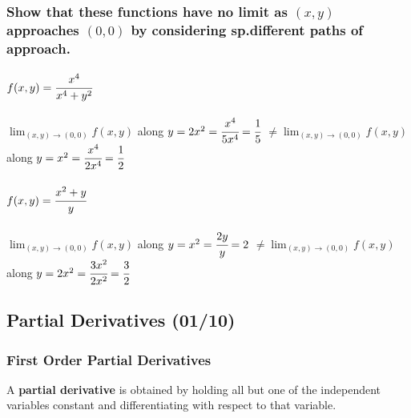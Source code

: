 \documentclass[
  letterpaper,
  DIV=11,
  numbers=noendperiod]{scrartcl}
\let\oldparagraph\paragraph
\renewcommand{\paragraph}[1]{\oldparagraph{#1}\mbox{}}
\begin{document}
\hypertarget{show-that-these-functions-have-no-limit-as-x-y-approaches-0-0-by-considering-sp.different-paths-of-approach.}{%
\subsubsection{\texorpdfstring{Show that these functions have no limit
as \((x, y)\) approaches \((0, 0)\) by considering sp.different paths of
approach.}{Show that these functions have no limit as (x, y) approaches (0, 0) by considering sp.different paths of approach.}}\label{show-that-these-functions-have-no-limit-as-x-y-approaches-0-0-by-considering-sp.different-paths-of-approach.}}

\hypertarget{fxy-cfracx4x4y2}{%
\paragraph{\texorpdfstring{\(f(x,y) = \cfrac{x^4}{x^4+y^2}\)}{f(x,y) = \textbackslash cfrac\{x\^{}4\}\{x\^{}4+y\^{}2\}}}\label{fxy-cfracx4x4y2}}

\(\lim_{(x, y)\rightarrow(0, 0)} f(x, y)\) along
\(y=2x^2 = \cfrac{x^4}{5x^4}=\cfrac{1}{5}\)
\(\ne \lim_{(x, y)\rightarrow(0, 0)} f(x, y)\) along
\(y=x^2 = \cfrac{x^4}{2x^4} = \cfrac{1}{2}\)

\hypertarget{fx-y-cfracx2yy}{%
\paragraph{\texorpdfstring{\(f(x, y) = \cfrac{x^2+y}{y}\)}{f(x, y) = \textbackslash cfrac\{x\^{}2+y\}\{y\}}}\label{fx-y-cfracx2yy}}

\(\lim_{(x, y)\rightarrow(0,0)} f(x, y)\) along
\(y=x^2 = \cfrac{2y}{y} = 2\)
\(\ne \lim_{(x, y)\rightarrow(0,0)} f(x, y)\) along
\(y=2x^2 = \cfrac{3x^2}{2x^2} = \cfrac{3}{2}\)

\hypertarget{partial-derivatives-0110}{%
\subsection{Partial Derivatives
(01/10)}\label{partial-derivatives-0110}}

\hypertarget{first-order-partial-derivatives}{%
\subsubsection{First Order Partial
Derivatives}\label{first-order-partial-derivatives}}

A \textbf{partial derivative} is obtained by holding all but one of the
independent variables constant and differentiating with respect to that
variable.
\end{document}
